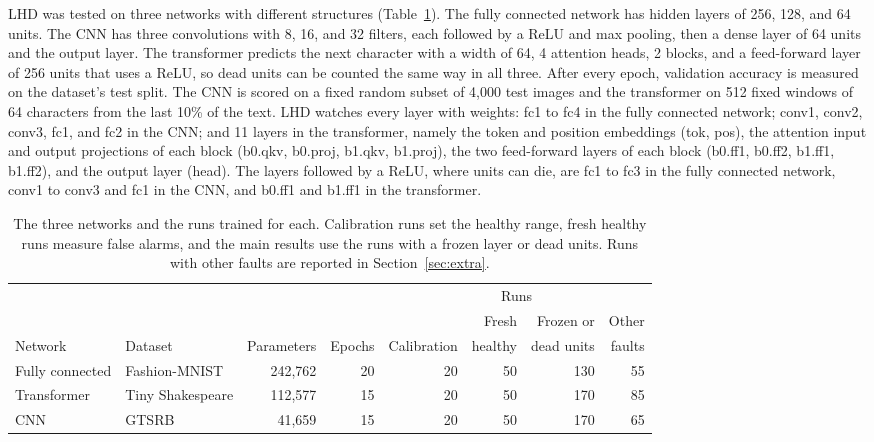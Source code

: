 \documentclass[11pt]{article}
\begin{document}
LHD was tested on three networks with different structures (Table~\ref{tab:networks}). The fully connected network has hidden layers of 256, 128, and 64 units. The CNN has three convolutions with 8, 16, and 32 filters, each followed by a ReLU and max pooling, then a dense layer of 64 units and the output layer. The transformer predicts the next character with a width of 64, 4 attention heads, 2 blocks, and a feed-forward layer of 256 units that uses a ReLU, so dead units can be counted the same way in all three. After every epoch, validation accuracy is measured on the dataset's test split. The CNN is scored on a fixed random subset of 4,000 test images and the transformer on 512 fixed windows of 64 characters from the last 10\% of the text. LHD watches every layer with weights: fc1 to fc4 in the fully connected network; conv1, conv2, conv3, fc1, and fc2 in the CNN; and 11 layers in the transformer, namely the token and position embeddings (tok, pos), the attention input and output projections of each block (b0.qkv, b0.proj, b1.qkv, b1.proj), the two feed-forward layers of each block (b0.ff1, b0.ff2, b1.ff1, b1.ff2), and the output layer (head). The layers followed by a ReLU, where units can die, are fc1 to fc3 in the fully connected network, conv1 to conv3 and fc1 in the CNN, and b0.ff1 and b1.ff1 in the transformer.

\begin{table}[t]
\centering
\small
\caption{The three networks and the runs trained for each. Calibration runs set the healthy range, fresh healthy runs measure false alarms, and the main results use the runs with a frozen layer or dead units. Runs with other faults are reported in Section~\ref{sec:extra}.}
\label{tab:networks}
\begin{tabular}{@{}llrrrrrr@{}}
\toprule
 & & & & \multicolumn{4}{c}{Runs} \\
\cmidrule(l){5-8}
 & & & & & Fresh & Frozen or & Other \\
Network & Dataset & Parameters & Epochs & Calibration & healthy & dead units & faults \\
\midrule
Fully connected & Fashion-MNIST & 242,762 & 20 & 20 & 50 & 130 & 55 \\
Transformer & Tiny Shakespeare & 112,577 & 15 & 20 & 50 & 170 & 85 \\
CNN & GTSRB & 41,659 & 15 & 20 & 50 & 170 & 65 \\
\bottomrule
\end{tabular}
\end{table}
\end{document}
